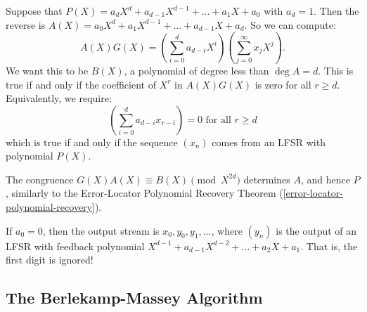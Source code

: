 \documentclass{article}
\begin{document}
\begin{prf}
    Suppose that $P(X) = a_d X^d + a_{d-1} X^{d-1} + \dots + a_1 X + a_0$ with $a_d = 1$. Then the reverse is $A(X) = a_0 X^d + a_1 X^{d-1} + \dots + a_{d-1} X + a_d$. So we can compute:
    \[
	A(X) G(X) =
	\left( \sum_{i=0}^d a_{d-i} X^i \right)
	\left( \sum_{j=0}^\infty x_j X^j \right).
	\]
	We want this to be $B(X)$, a polynomial of degree less than $\deg A = d$. This is true if and only if the coefficient of $X^r$ in $A(X)G(X)$ is zero for all $r \geq d$. Equivalently, we require:
	\[
	\left( \sum_{i=0}^d a_{d-i} x_{r-i} \right) = 0 \text{ for all $r \geq d$}
	\]
	which is true if and only if the sequence $(x_n)$ comes from an LFSR with polynomial $P(X)$.
\end{prf}

\begin{corollary}
    The congruence $G(X)A(X) \equiv B(X) \pmod{X^{2d}}$ determines $A$, and hence $P$, similarly to the Error-Locator Polynomial Recovery Theorem (\ref{error-locator-polynomial-recovery}).
\end{corollary}

\begin{note}
	If $a_0 = 0$, then the output stream is $x_0, y_0, y_1, \dots$, where $(y_n)$ is the output of an LFSR with feedback polynomial $X^{d-1} + a_{d-1} X^{d-2} + \dots + a_2 X + a_1$. That is, the first digit is ignored!
\end{note}


\subsection{The Berlekamp-Massey Algorithm}
\label{section-algebraic-berlekamp-massey}
\end{document}
